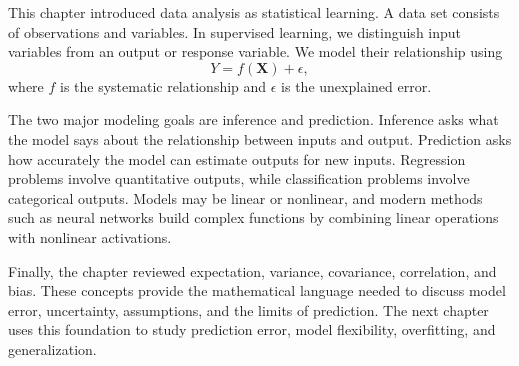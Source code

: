 This chapter introduced data analysis as statistical learning.  A data set consists of observations and variables.  In supervised learning, we distinguish input variables from an output or response variable.  We model their relationship using
\[
  Y = f(\mathbf{X}) + \epsilon,
\]
where $f$ is the systematic relationship and $\epsilon$ is the unexplained error.

The two major modeling goals are inference and prediction.  Inference asks what the model says about the relationship between inputs and output.  Prediction asks how accurately the model can estimate outputs for new inputs.  Regression problems involve quantitative outputs, while classification problems involve categorical outputs.  Models may be linear or nonlinear, and modern methods such as neural networks build complex functions by combining linear operations with nonlinear activations.

Finally, the chapter reviewed expectation, variance, covariance, correlation, and bias.  These concepts provide the mathematical language needed to discuss model error, uncertainty, assumptions, and the limits of prediction.  The next chapter uses this foundation to study prediction error, model flexibility, overfitting, and generalization.
